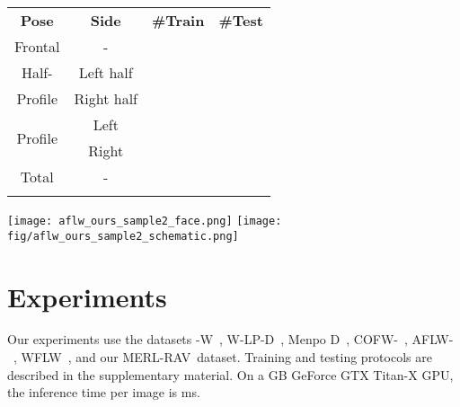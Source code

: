 \documentclass[10pt,twocolumn,letterpaper]{article}
\newcommand{\threehundredW}{-W}
\newcommand{\threehundredLP}{W-LP-D}
\newcommand{\menpoTwoD}{Menpo D}
\newcommand{\cofwSixtyEight}{COFW-}
\newcommand{\aflwNineteen}{AFLW-}
\newcommand{\ourdataset}{MERL-RAV}
\newcommand{\1}{{\bf 1}}
\newcommand{\0}{{\bf 0}}
\newcommand{\myTopRule}{\Xhline{2\arrayrulewidth}}
\begin{document}
    \begin{table}[!tb]
        \begin{minipage}[b]{0.5\linewidth}
            \footnotesize
            \setlength{\tabcolsep}{0.075cm}
            \begin{tabular}{cccc}
                \myTopRule
                \textbf{Pose} & \textbf{Side} & \textbf{\#Train} & \textbf{\#Test}\\
                \myTopRule
                Frontal       & -             &            & \\
                \hline
                Half-         & Left half     &            & \\
                Profile       & Right half    &            & \\
                \hline
                \multirow{2}{*}{Profile} 
                              & Left          &            & \\
                              & Right         &            & \\
                \myTopRule
                Total         & -             &           & \\
                \myTopRule
            \end{tabular}
            \label{tab:dataset_statistics}
        \end{minipage}
        \hfill
        \begin{minipage}[b]{0.44\linewidth}
            \centering
\texttt{[image: aflw\_ours\_sample2\_face.png]}
            \texttt{[image: fig/aflw\_ours\_sample2\_schematic.png]}
            \label{fig:sample}
        \end{minipage}
        \vspace{-0.5cm}
    \end{table}
    
    

\section{Experiments}\label{sec:exp}
\vspace{-0.15cm}
    Our experiments use the datasets \threehundredW~\cite{sagonas2013300, sagonas2016300, sagonas2013semi}, \threehundredLP~\cite{zhu2016face}, \menpoTwoD~\cite{zafeiriou2017menpo, trigeorgis2016mnemonic, deng2019menpo}, \cofwSixtyEight~\cite{burgos2013robust, ghiasi2015occlusion}, \aflwNineteen~\cite{koestinger2011annotated}, WFLW~\cite{wu2018look}, and our \ourdataset~dataset. Training and testing protocols are described in the supplementary material. On a  GB GeForce GTX Titan-X GPU, the inference time per image is  ms.
\end{document}
